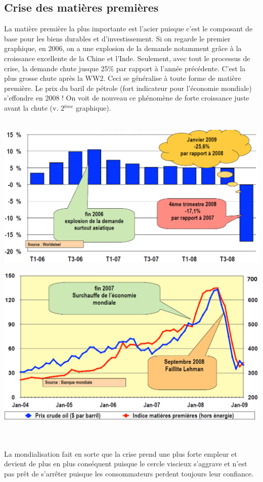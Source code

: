 \subsection{Crise des matières premières}
La matière première la plus importante est l'acier puisque c'est le composant de base pour les biens durables et d'investissement. Si on regarde le premier graphique, en 2006, on a une explosion de la demande notamment grâce à la croissance excellente de la Chine et l'Inde. Seulement, avec tout le processus de crise, la demande chute jusque 25\% par rapport à l'année précédente. C'est la plus grosse chute après la WW2. Ceci se généralise à toute forme de matière première. Le prix du baril de pétrole (fort indicateur pour l'économie mondiale) s'effondre en 2008 ! On voit de nouveau ce phénomène de forte croissance juste avant la chute (v. 2$^{ème}$ graphique).
\\\\
\begin{minipage}{0.55\textwidth}
	\begin{flushleft}
		\includegraphics[scale=0.28]{20}
	\end{flushleft}
\end{minipage}
\begin{minipage}{0.5\textwidth}
	\begin{flushright}
		\includegraphics[scale=0.3]{21}
	\end{flushright}
\end{minipage}
\\\\
La mondialisation fait en sorte que la crise prend une plus forte empleur et devient de plus en plus conséquent puisque le cercle viscieux s'aggrave et n'est pas prêt de s'arrêter puisque les consommateurs perdent toujours leur confiance. 

